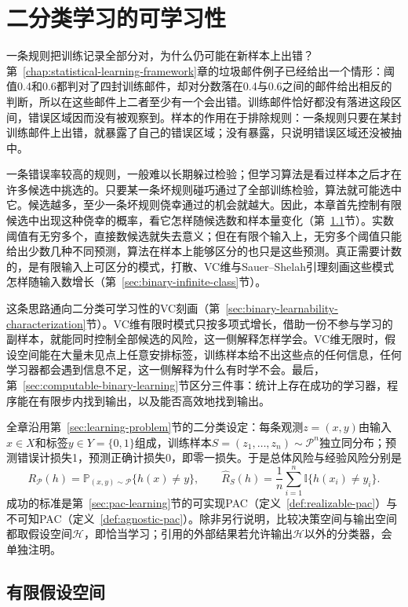 \chapter{二分类学习的可学习性}
\label{chap:binary-learnability}

一条规则把训练记录全部分对，为什么仍可能在新样本上出错？第~\ref{chap:statistical-learning-framework}章的垃圾邮件例子已经给出一个情形：阈值0.4和0.6都判对了四封训练邮件，却对分数落在0.4与0.6之间的邮件给出相反的判断，所以在这些邮件上二者至少有一个会出错。训练邮件恰好都没有落进这段区间，错误区域因而没有被观察到。样本的作用在于排除规则：一条规则只要在某封训练邮件上出错，就暴露了自己的错误区域；没有暴露，只说明错误区域还没被抽中。

一条错误率较高的规则，一般难以长期躲过检验；但学习算法是看过样本之后才在许多候选中挑选的。只要某一条坏规则碰巧通过了全部训练检验，算法就可能选中它。候选越多，至少一条坏规则侥幸通过的机会就越大。因此，本章首先控制有限候选中出现这种侥幸的概率，看它怎样随候选数和样本量变化（第~\ref{sec:binary-finite-class}节）。实数阈值有无穷多个，直接数候选就失去意义；但在有限个输入上，无穷多个阈值只能给出少数几种不同预测，算法在样本上能够区分的也只是这些预测。真正需要计数的，是有限输入上可区分的模式，打散、VC维与Sauer--Shelah引理刻画这些模式怎样随输入数增长（第~\ref{sec:binary-infinite-class}节）。

这条思路通向二分类可学习性的VC刻画（第~\ref{sec:binary-learnability-characterization}节）。VC维有限时模式只按多项式增长，借助一份不参与学习的副样本，就能同时控制全部候选的风险，这一侧解释怎样学会。VC维无限时，假设空间能在大量未见点上任意安排标签，训练样本给不出这些点的任何信息，任何学习器都会遇到信息不足，这一侧解释为什么有时学不会。最后，第~\ref{sec:computable-binary-learning}节区分三件事：统计上存在成功的学习器，程序能在有限步内找到输出，以及能否高效地找到输出。

全章沿用第~\ref{sec:learning-problem}节的二分类设定：每条观测$z=(x,y)$由输入$x\in X$和标签$y\in Y=\{0,1\}$组成，训练样本$S=(z_1,\ldots,z_n)\sim\mathcal P^n$独立同分布；预测错误计损失1，预测正确计损失0，即零一损失。于是总体风险与经验风险分别是
\[
 R_{\mathcal P}(h)=\mathbb P_{(x,y)\sim\mathcal P}\{h(x)\neq y\},\qquad
 \hat R_S(h)=\frac1n\sum_{i=1}^n\mathbb I\{h(x_i)\neq y_i\}.
\]
成功的标准是第~\ref{sec:pac-learning}节的可实现PAC（定义~\ref{def:realizable-pac}）与不可知PAC（定义~\ref{def:agnostic-pac}）。除非另行说明，比较决策空间与输出空间都取假设空间$\mathcal H$，即恰当学习；引用的外部结果若允许输出$\mathcal H$以外的分类器，会单独注明。

\section{有限假设空间}
\label{sec:binary-finite-class}


